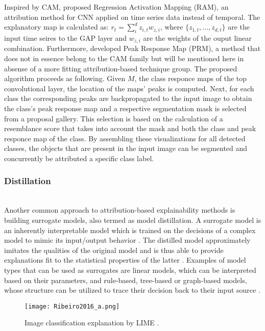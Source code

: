 \documentclass[journal]{IEEEtran}
\begin{document}
Inspired by CAM, \cite{Wolanin2020} proposed Regression Activation Mapping (RAM), an attribution method for CNN applied on time series data instead of temporal. The explanatory map is calculated as: $r_t=\sum_i^d z_{i,t}w_{z,i}$, where $\{z_{1,t},...,z_{d,t}\}$ are the input time seires to the GAP layer and $w_{z,i}$ are the weights of the ouput linear combination.
Furthermore, \cite{Zhou2018} developed Peak Response Map (PRM), a method that does not in essence belong to the CAM family but will be mentioned here in absense of a more fitting attribution-based technique group. The proposed algorithm proceeds as following. Given $M$, the class responce maps of the top convolutional layer, the location of the maps' peaks is computed. Next, for each class the corresponding peaks are backpropagated to the input image to obtain the class's peak response map and a respective segmentation mask is selected from a proposal gallery. This selection is based on the calculation of a resemblance score that takes into account the mask and both the class and peak responce map of the class. By assembling these visualizations for all detected classes, the objects that are present in the input image can be segmented and concurrently be attributed a specific class label.

\subsubsection{Distillation}
\hfill\\
Another common approach to attribution-based explainability methods is building surrogate models, also termed as model distillation. A surrogate model is an inherently interpretable model which is trained on the decisions of a complex model to mimic its input/output behavior \cite{Adadi2018}. The distilled model approximately imitates the qualities of the original model and is thus able to provide explanations fit to the statistical properties of the latter \cite{Du2018}. Examples of model types that can be used as surrogates are linear models, which can be interpreted based on their parameters, and rule-based, tree-based or graph-based models, whose structure can be utilized to trace their decision back to their input source \cite{Das2020}. 

\begin{figure}
  \texttt{[image: Ribeiro2016\_a.png]}
  \caption{Image classification explanation by LIME \cite{Ribeiro2016}.}
\end{figure}
\end{document}
